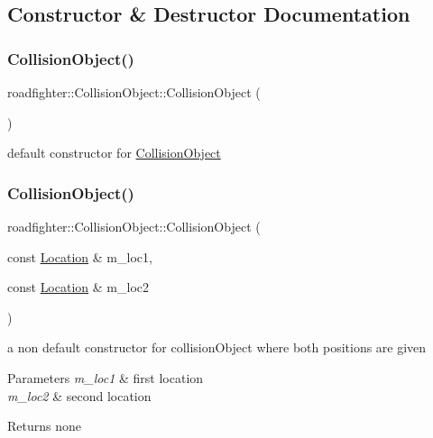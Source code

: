 \subsection{Constructor \& Destructor Documentation}
\mbox{\label{classroadfighter_1_1CollisionObject_aa627fcee5f0f313b29d601452dadc3b0}} 
\subsubsection{\texorpdfstring{Collision\+Object()}{CollisionObject()}\hspace{0.1cm}{\footnotesize\ttfamily [1/4]}}
{\footnotesize\ttfamily roadfighter\+::\+Collision\+Object\+::\+Collision\+Object (\begin{DoxyParamCaption}{ }\end{DoxyParamCaption})\hspace{0.3cm}{\ttfamily [default]}}

default constructor for \hyperlink{classroadfighter_1_1CollisionObject}{Collision\+Object} \mbox{\label{classroadfighter_1_1CollisionObject_a79e8e65670d1b424f1c4fadf1adde094}} 
\subsubsection{\texorpdfstring{Collision\+Object()}{CollisionObject()}\hspace{0.1cm}{\footnotesize\ttfamily [2/4]}}
{\footnotesize\ttfamily roadfighter\+::\+Collision\+Object\+::\+Collision\+Object (\begin{DoxyParamCaption}\item[{const \hyperlink{classroadfighter_1_1Location}{Location} \&}]{m\+\_\+loc1,  }\item[{const \hyperlink{classroadfighter_1_1Location}{Location} \&}]{m\+\_\+loc2 }\end{DoxyParamCaption})}

a non default constructor for collision\+Object where both positions are given 
\begin{DoxyParams}{Parameters}
{\em m\+\_\+loc1} & first location \\
\hline
{\em m\+\_\+loc2} & second location \\
\hline
\end{DoxyParams}
\begin{DoxyReturn}{Returns}
none 
\end{DoxyReturn}

